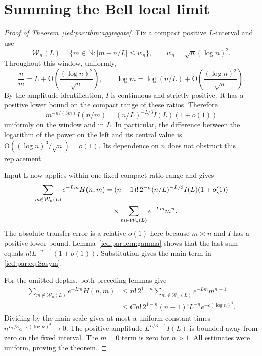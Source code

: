 \documentclass[11pt,letterpaper]{article}
\theoremstyle{remark}\newtheorem{remark}[theorem]{Remark}
\newcommand{\N}{\mathbb N}\newcommand{\e}{\mathrm e}
\newcommand{\Oh}{\mathrm O}\newcommand{\supp}{\operatorname{supp}}
\begin{document}
\section{Summing the Bell local limit}\label{ied:par:sec:aggregation}

\begin{proof}[Proof of Theorem~\ref{ied:par:thm:aggregate}]
Fix a compact positive $L$-interval and use
\[
 \mathcal W_n(L)=
 \{m\in\N:|m-n/L|\le w_n\},
 \qquad w_n=\sqrt n(\log n)^2.
\]
Throughout this window, uniformly,
\[
 \frac nm=L+\Oh\!\left(\frac{(\log n)^2}{\sqrt n}\right),
 \qquad
 \log m=\log(n/L)+
 \Oh\!\left(\frac{(\log n)^2}{\sqrt n}\right).
\]
By the amplitude identification, $I$ is continuous and strictly
positive. It has a positive lower bound on the compact range of these
ratios. Therefore
\begin{equation}\label{ied:par:eq:slow}
 m^{-n/(3m)}I(n/m)
 =(n/L)^{-L/3}I(L)(1+o(1))
\end{equation}
uniformly on the window and in $L$. In particular, the difference
between the logarithm of the power on the left and its central value is
$\Oh((\log n)^3/\sqrt n)=o(1)$. Its dependence on $n$ does not
obstruct this replacement.

Input L now applies within one fixed compact ratio range and gives
\begin{align}
 \sum_{m\in\mathcal W_n(L)}e^{-Lm}H(n,m)
 &=(n-1)!\,2^{-n}(n/L)^{-L/3}I(L)(1+o(1))\notag\\
 &\quad\times\sum_{m\in\mathcal W_n(L)}e^{-Lm}m^n.
 \label{ied:par:eq:central}
\end{align}
The absolute transfer error is a relative $o(1)$ here because
$m\asymp n$ and $I$ has a positive lower bound.
Lemma~\ref{ied:par:lem:gamma} shows that the last sum equals
$n!L^{-n-1}(1+o(1))$.
Substitution gives the main term in \eqref{ied:par:eq:Sasym}.

For the omitted depths, both preceding lemmas give
\begin{align*}
 \sum_{m\notin\mathcal W_n(L)}e^{-Lm}H(n,m)
 &\le n!\,2^{1-n}
 \sum_{m\notin\mathcal W_n(L)}e^{-Lm}m^{n-1}\\
 &\le Cn!\,2^{1-n}(n-1)!L^{-n}e^{-c(\log n)^4}.
\end{align*}
Dividing by the main scale gives at most a uniform constant times
$n^{L_1/3}e^{-c(\log n)^4}\to0$.
The positive amplitude $L^{L/3-1}I(L)$ is bounded away from zero on
the fixed interval. The $m=0$ term is zero for $n>1$.
All estimates were uniform, proving the theorem.
\end{proof}
\end{document}

